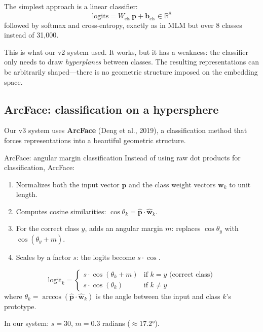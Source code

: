 \documentclass[11pt,a4paper]{article}
\theoremstyle{definition}
\begin{document}
The simplest approach is a linear classifier:
\[
\text{logits} = W_{\text{cls}} \, \mathbf{p} + \mathbf{b}_{\text{cls}}
\in \mathbb{R}^8
\]
followed by softmax and cross-entropy, exactly as in MLM but over 8
classes instead of 31,000.

This is what our v2 system used. It works, but it has a weakness: the
classifier only needs to draw \emph{hyperplanes} between classes. The
resulting representations can be arbitrarily shaped---there is no
geometric structure imposed on the embedding space.

\subsection{ArcFace: classification on a hypersphere}
\label{sec:arcface}

Our v3 system uses \textbf{ArcFace} (Deng et al., 2019), a
classification method that forces representations into a beautiful
geometric structure.

\begin{keyidea}{ArcFace: angular margin classification}
Instead of using raw dot products for classification, ArcFace:
\begin{enumerate}[nosep]
  \item Normalizes both the input vector $\mathbf{p}$ and the class
        weight vectors $\mathbf{w}_k$ to unit length.
  \item Computes cosine similarities: $\cos\theta_k = \hat{\mathbf{p}}
        \cdot \hat{\mathbf{w}}_k$.
  \item For the correct class $y$, adds an angular margin $m$:
        replaces $\cos\theta_y$ with $\cos(\theta_y + m)$.
  \item Scales by a factor $s$: the logits become $s \cdot \cos$.
\end{enumerate}
\end{keyidea}

\begin{mathbox}
\[
\text{logit}_k =
\begin{cases}
s \cdot \cos(\theta_k + m) & \text{if } k = y \text{ (correct class)} \\
s \cdot \cos(\theta_k) & \text{if } k \neq y
\end{cases}
\]
where $\theta_k = \arccos(\hat{\mathbf{p}} \cdot \hat{\mathbf{w}}_k)$
is the angle between the input and class $k$'s prototype.

In our system: $s = 30$, $m = 0.3$ radians ($\approx 17.2°$).
\end{mathbox}
\end{document}
